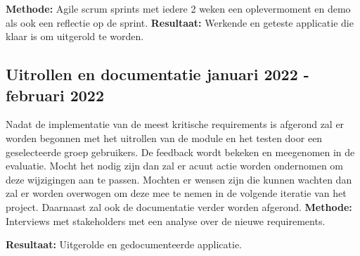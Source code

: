 \textbf{Methode:} Agile scrum sprints met iedere 2 weken een oplevermoment en demo als ook een reflectie op de sprint.
\textbf{Resultaat:} Werkende en geteste applicatie die klaar is om uitgerold te worden.

\subsection{Uitrollen en documentatie \textbf{januari 2022 - februari 2022 }}\label{subsec:uitrollen-en-documentatie}
Nadat de implementatie van de meest kritische requirements is afgerond zal er worden begonnen met het uitrollen van de module en het testen door een geselecteerde groep gebruikers. De feedback wordt bekeken en meegenomen in de evaluatie. Mocht het nodig zijn dan zal er acuut actie worden ondernomen om deze wijzigingen aan te passen. Mochten er wensen zijn die kunnen wachten dan zal er worden overwogen om deze mee te nemen in de volgende iteratie van het project. Daarnaast zal ook de documentatie verder worden afgerond.
\textbf{Methode:} Interviews met stakeholders met een analyse over de nieuwe requirements.

\textbf{Resultaat:} Uitgerolde en gedocumenteerde applicatie.
